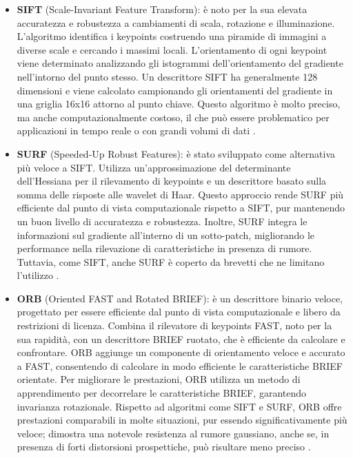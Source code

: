 \begin{itemize}
    \item \textbf{SIFT} (Scale-Invariant Feature Transform): è noto per la sua elevata accuratezza e robustezza a cambiamenti di scala, rotazione e illuminazione. L'algoritmo identifica i keypoints costruendo una piramide di immagini a diverse scale e cercando i massimi locali. L'orientamento di ogni keypoint viene determinato analizzando gli istogrammi dell'orientamento del gradiente nell'intorno del punto stesso. Un descrittore SIFT ha generalmente 128 dimensioni e viene calcolato campionando gli orientamenti del gradiente in una griglia 16x16 attorno al punto chiave. Questo algoritmo è molto preciso, ma anche computazionalmente costoso, il che può essere problematico per applicazioni in tempo reale o con grandi volumi di dati \cite{sift}.
    
    \item \textbf{SURF} (Speeded-Up Robust Features): è stato sviluppato come alternativa più veloce a SIFT. Utilizza un'approssimazione del determinante dell'Hessiana per il rilevamento di keypoints e un descrittore basato sulla somma delle risposte alle wavelet di Haar. Questo approccio rende SURF più efficiente dal punto di vista computazionale rispetto a SIFT, pur mantenendo un buon livello di accuratezza e robustezza. Inoltre, SURF integra le informazioni sul gradiente all'interno di un sotto-patch, migliorando le performance nella rilevazione di caratteristiche in presenza di rumore. Tuttavia, come SIFT, anche SURF è coperto da brevetti che ne limitano l'utilizzo \cite{surf}.

    \item \textbf{ORB} (Oriented FAST and Rotated BRIEF): è un descrittore binario veloce, progettato per essere efficiente dal punto di vista computazionale e libero da restrizioni di licenza. Combina il rilevatore di keypoints FAST, noto per la sua rapidità, con un descrittore BRIEF ruotato, che è efficiente da calcolare e confrontare. ORB aggiunge un componente di orientamento veloce e accurato a FAST, consentendo di calcolare in modo efficiente le caratteristiche BRIEF orientate. Per migliorare le prestazioni, ORB utilizza un metodo di apprendimento per decorrelare le caratteristiche BRIEF, garantendo invarianza rotazionale. Rispetto ad algoritmi come SIFT e SURF, ORB offre prestazioni comparabili in molte situazioni, pur essendo significativamente più veloce; dimostra una notevole resistenza al rumore gaussiano, anche se, in presenza di forti distorsioni prospettiche, può risultare meno preciso \cite{orb}.
 
\end{itemize}


